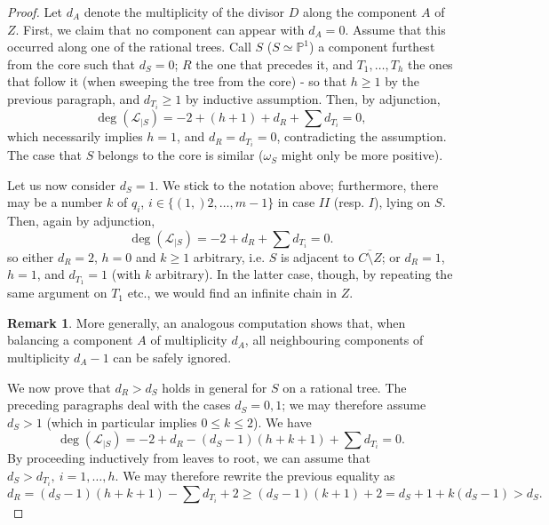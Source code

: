 \documentclass[11pt]{amsart}
\newcommand{\PP}{\mathbb P}
\theoremstyle{plain}
\theoremstyle{definition}
\newtheorem{rem}[thm]{Remark}
\begin{document}
\begin{proof}
Let $d_A$ denote the multiplicity of the divisor $D$ along the component $A$ of $Z$. First, we claim that no component can appear with $d_A=0$. Assume that this occurred along one of the rational trees. Call $S$ ($S\simeq\PP^1$) a component furthest from the core such that $d_S=0$; $R$ the one that precedes it, and $T_1,\ldots, T_h$ the ones that follow it (when sweeping the tree from the core) - so that $h\geq1$ by the previous paragraph, and $d_{T_i}\geq 1$ by inductive assumption. Then, by adjunction,
 \[\deg(\mathcal L_{|S})= -2+(h+1)+d_R+\sum d_{T_i}=0,\]
 which necessarily implies $h=1$, and $d_R=d_{T_i}=0$, contradicting the assumption. The case that $S$ belongs to the core is similar ($\omega_S$ might only be more positive).
 \begin{center}
\end{center}
 
Let us now consider $d_S=1$. We stick to the notation above; furthermore, there may be a number $k$ of $q_i$, $i\in\{(1,)2,\ldots,m-1\}$ in case $I\!I$ (resp. $I$), lying on $S$. Then, again by adjunction,
 \[\deg(\mathcal L_{|S})= -2+d_R+\sum d_{T_i}=0.\]
 so either $d_R=2$, $h=0$ and $k\geq 1$ arbitrary, i.e. $S$ is adjacent to $\overline{C\setminus Z}$; or $d_R=1$, $h=1$, and $d_{T_1}=1$ (with $k$ arbitrary). In the latter case, though, by repeating the same argument on $T_1$ etc., we would find an infinite chain in $Z$. 
 \begin{rem}\label{rmk:ignoring_1-trees}
  More generally, an analogous computation shows that, when balancing a component $A$ of multiplicity $d_A$, all neighbouring components of multiplicity $d_A-1$ can be safely ignored.%
 \end{rem}

 We now prove that $d_R>d_S$ holds in general for $S$ on a rational tree. The preceding paragraphs deal with the cases $d_S=0,1$; we may therefore assume $d_S>1$ (which in particular implies $0\leq k\leq 2$). We have
 \[\deg(\mathcal L_{|S})= -2+d_R-(d_S-1)(h+k+1)+\sum d_{T_i}=0.\]
 By proceeding inductively from leaves to root, we can assume that $d_S>d_{T_i},\ i=1,\ldots,h$. We may therefore rewrite the previous equality as
 \[d_R=(d_S-1)(h+k+1)-\sum d_{T_i}+2\geq(d_S-1)(k+1)+2=d_S+1+k(d_S-1)>d_S.\]
 

\end{proof}
\end{document}
